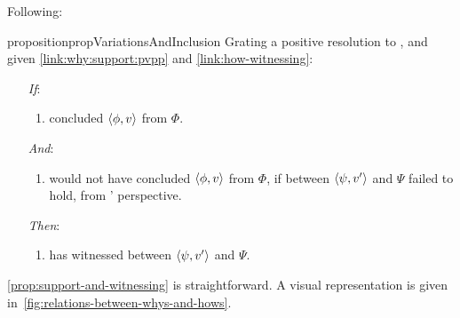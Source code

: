 \begin{note}
 Following:

  \begin{restatable}[]{proposition}{propVariationsAndInclusion}
    \label{prop:support-and-witnessing}
    Grating a positive resolution to \issueInclusion{}, and given \autoref{link:why:support:pvpp} and \autoref{link:how-witnessing}:
    \begin{enumerate}
    \item[\emph{If}:]
      \begin{enumerate}[label=\alph*., ref=(\alph*)]
      \item \vAgent{} concluded \(\langle \phi, v \rangle\) from \(\Phi\).
      \end{enumerate}
    \item[\emph{And}:]
      \begin{enumerate}[label=\alph*., ref=(\alph*), resume]
      \item
        \vAgent{} would not have concluded \(\langle \phi, v \rangle\) from \(\Phi\), if \support{} between \(\langle \psi, v' \rangle\) and \(\Psi\) failed to hold, from \vAgent{}' perspective.
      \end{enumerate}
    \item[\emph{Then}:]
      \begin{enumerate}[label=\alph*., ref=(\alph*), resume]
      \item
        \vAgent{} has witnessed \support{} between \(\langle \psi, v' \rangle\) and \(\Psi\).
      \end{enumerate}
    \end{enumerate}
  \end{restatable}

  \autoref{prop:support-and-witnessing} is straightforward.
  A visual representation is given in~\autoref{fig:relations-between-whys-and-hows}.
\end{note}

